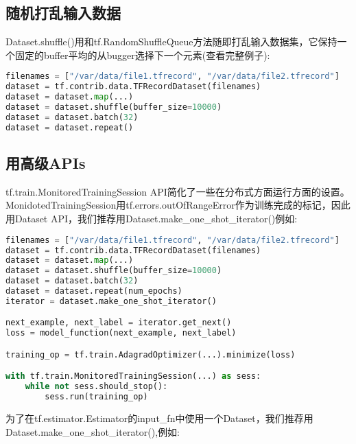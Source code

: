 \subsection{随机打乱输入数据}
Dataset.shuffle()用和tf.RandomShuffleQueue方法随即打乱输入数据集，它保持一个固定的buffer平均的从bugger选择下一个元素(查看完整例子):
\begin{lstlisting}[language=Python]
filenames = ["/var/data/file1.tfrecord", "/var/data/file2.tfrecord"]
dataset = tf.contrib.data.TFRecordDataset(filenames)
dataset = dataset.map(...)
dataset = dataset.shuffle(buffer_size=10000)
dataset = dataset.batch(32)
dataset = dataset.repeat()
\end{lstlisting}
\subsection{用高级APIs}
tf.train.MonitoredTrainingSession API简化了一些在分布式方面运行方面的设置。MonidotedTrainingSession用tf.errors.outOfRangeError作为训练完成的标记，因此用Dataset API，我们推荐用Dataset.make\_one\_shot\_iterator()例如:
\begin{lstlisting}[language=Python]
filenames = ["/var/data/file1.tfrecord", "/var/data/file2.tfrecord"]
dataset = tf.contrib.data.TFRecordDataset(filenames)
dataset = dataset.map(...)
dataset = dataset.shuffle(buffer_size=10000)
dataset = dataset.batch(32)
dataset = dataset.repeat(num_epochs)
iterator = dataset.make_one_shot_iterator()

next_example, next_label = iterator.get_next()
loss = model_function(next_example, next_label)

training_op = tf.train.AdagradOptimizer(...).minimize(loss)

with tf.train.MonitoredTrainingSession(...) as sess:
    while not sess.should_stop():
        sess.run(training_op)
\end{lstlisting}
为了在tf.estimator.Estimator的input\_fn中使用一个Dataset，我们推荐用Dataset.make\_one\_shot\_iterator(),例如:
